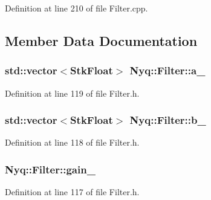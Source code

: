 Definition at line 210 of file Filter.\+cpp.



\subsection{Member Data Documentation}
\subsubsection[{\texorpdfstring{a\+\_\+}{a_}}]{\setlength{\rightskip}{0pt plus 5cm}std\+::vector$<${\bf Stk\+Float}$>$ Nyq\+::\+Filter\+::a\+\_\+\hspace{0.3cm}{\ttfamily [protected]}}\hypertarget{class_nyq_1_1_filter_a5b5dc76bc37e05f5d69aeb08c7a15697}{}\label{class_nyq_1_1_filter_a5b5dc76bc37e05f5d69aeb08c7a15697}


Definition at line 119 of file Filter.\+h.

\subsubsection[{\texorpdfstring{b\+\_\+}{b_}}]{\setlength{\rightskip}{0pt plus 5cm}std\+::vector$<${\bf Stk\+Float}$>$ Nyq\+::\+Filter\+::b\+\_\+\hspace{0.3cm}{\ttfamily [protected]}}\hypertarget{class_nyq_1_1_filter_a50e3f46dac0fe36e42fd35b944031ccb}{}\label{class_nyq_1_1_filter_a50e3f46dac0fe36e42fd35b944031ccb}


Definition at line 118 of file Filter.\+h.

\subsubsection[{\texorpdfstring{gain\+\_\+}{gain_}}]{ Nyq\+::\+Filter\+::gain\+\_\+\hspace{0.3cm}{\ttfamily [protected]}}\hypertarget{class_nyq_1_1_filter_afc2d4c6c45ae1287c05a450ee376035b}{}\label{class_nyq_1_1_filter_afc2d4c6c45ae1287c05a450ee376035b}


Definition at line 117 of file Filter.\+h.

